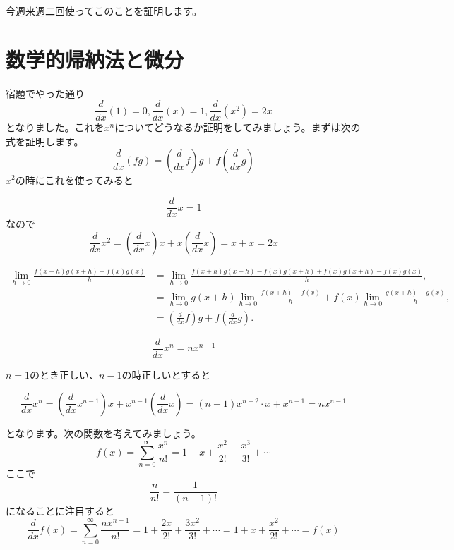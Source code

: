 \documentclass{ltjsarticle}
\begin{document}
今週来週二回使ってこのことを証明します。

\section{数学的帰納法と微分}



宿題でやった通り
\begin{equation*}
{\frac d {dx}}(1) = 0, {\frac d {dx}}(x) = 1,{\frac d {dx}}(x^2) = 2x
\end{equation*}
となりました。これを$x^n$についてどうなるか証明をしてみましょう。まずは次の式を証明します。
\begin{equation*}
{\frac d {dx}}(fg) = \left({\frac d {dx}}f\right)g+f\left({\frac d {dx}}g\right)
\end{equation*}
$x^2$の時にこれを使ってみると

\begin{equation*}
{\frac d {dx}}x = 1
\end{equation*}
なので
\begin{equation*}
{\frac d {dx}}x^2 = \left({\frac d {dx}}x\right)x+x\left({\frac d {dx}}x\right) = x+x = 2x
\end{equation*}

\begin{align*}
\lim_{h\to0}{\frac {f(x+h)g(x+h)-f(x)g(x)} {h}} &= \lim_{h\to0}{\frac {f(x+h)g(x+h)-f(x)g(x+h)+f(x)g(x+h)-f(x)g(x)} {h}},\\
& = \lim_{h\to0}g(x+h)\lim_{h\to0}{\frac {f(x+h)-f(x)} h}+f(x)\lim_{h\to0}{\frac {g(x+h)-g(x)} h},\\
& = \left({\frac d {dx}}f\right)g+f\left({\frac d {dx}}g\right).
\end{align*}



\begin{equation*}
{\frac d {dx}} x^n = nx^{n-1}
\end{equation*}

$n=1$のとき正しい、$n-1$の時正しいとすると

\begin{equation*}
{\frac d {dx}} x^n = \left({\frac d {dx}}x^{n-1}\right)x+x^{n-1}\left({\frac d {dx}}x\right) = (n-1)x^{n-2}\cdot x+x^{n-1} = nx^{n-1}
\end{equation*}

となります。次の関数を考えてみましょう。
\begin{equation*}
f(x) = \sum_{n=0}^\infty {\frac {x^n} {n!}} = 1+x+{\frac {x^2} {2!}}+{\frac {x^3} {3!}}+\cdots
\end{equation*}
ここで
\begin{equation*}
{\frac {n} {n!}} = {\frac 1 {(n-1)!}}
\end{equation*}
になることに注目すると
\begin{equation*}
{\frac d {dx}}f(x) = \sum_{n=0}^\infty {\frac {nx^{n-1}} {n!}} = 1+{\frac {2x} {2!}}+{\frac {3x^2} {3!}}+\cdots = 1+x+{\frac {x^2} {2!}}+\cdots = f(x)
\end{equation*}
\end{document}
